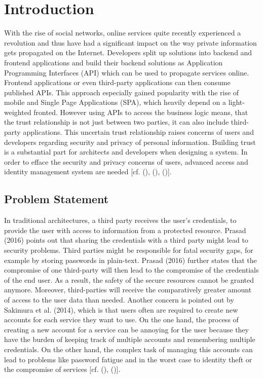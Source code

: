\chapter{Introduction}\label{chap:introduction}
\chapterstart

With the rise of social networks, online services quite recently experienced a revolution and thus have had a significant impact on the way private information gets propagated on the Internet. Developers split up solutions into backend and frontend applications and build their backend solutions as Application Programming Interfaces (API) which can be used to propagate services online. Frontend applications or even third-party applications can then consume published APIs. This approach especially gained popularity with the rise of mobile and Single Page Applications (SPA), which heavily depend on a light-weighted fronted. However using APIs to access the business logic means, that the trust relationship is not just between two parties, it can also include third-party applications. This uncertain trust relationship raises concerns of users and developers regarding security and privacy of personal information. Building trust is a substantial part for architects and developers when designing a system. In order to efface the security and privacy concerns of users, advanced access and identity management system are needed [cf. (\cite{Cirani:OBAS}), (\cite{Tkalec:2015}), (\cite{Rossvoll:2013:RUBIM})].


\section{Problem Statement}

In traditional architectures, a third party receives the user’s credentials, to provide the user with access to information from a protected resource. Prasad (2016) points out that sharing the credentials with a third party might lead to security problems. Third parties might be responsible for fatal security gaps, for example by storing passwords in plain-text. Prasad (2016) further states that the compromise of one third-party will then lead to the compromise of the credentials of the end user. As a result, the safety of the secure resources cannot be granted anymore. Moreover, third-parties will receive the comparatively greater amount of access to the user data than needed. Another concern is pointed out by Sakimura et al. (2014), which is that users often are required to create new accounts for each service they want to use. On the one hand, the process of creating a new account for a service can be annoying for the user because they have the burden of keeping track of multiple accounts and remembering multiple credentials. On the other hand, the complex task of managing this accounts can lead to problems like password fatigue and in the worst case to identity theft or the compromise of services [cf. (\cite{Sakimura:OIDCC}), (\cite{Prasad:MMWPT})].

